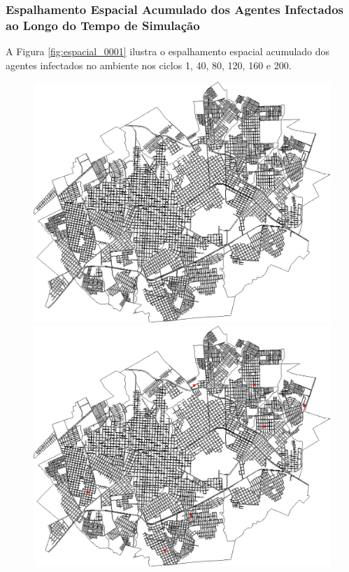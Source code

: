 \subsubsection{Espalhamento Espacial Acumulado dos Agentes Infectados ao Longo do Tempo de Simulação}

A Figura \ref{fig:espacial_0001} ilustra o espalhamento espacial acumulado dos agentes infectados no ambiente nos ciclos 1, 40, 80, 120, 160 e 200.

\begin{figure}[H]
  \centering
  \begin{minipage}{.5\textwidth}
    \centering
    \includegraphics[width=1.0\textwidth]{Figuras/Resultados/0001/Saidas_GPU_BIT/MonteCarlo_0/Simulacao_0/Espacial/00000.png}
    \captionsetup{labelformat=empty}
  \end{minipage}%
  \begin{minipage}{.5\textwidth}
    \centering
    \includegraphics[width=1.0\textwidth]{Figuras/Resultados/0001/Saidas_GPU_BIT/MonteCarlo_0/Simulacao_0/Espacial/00040.png}

\end{minipage}
\end{figure}
